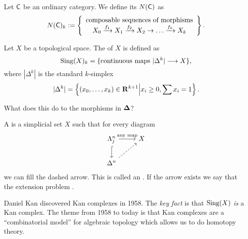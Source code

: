 \begin{example}
	Let $\mathsf{C}$ be an ordinary category. We define its  $N(\mathsf{C})$ as
	\[
		N(\C)_k \defeq \left\{ \begin{array}{c}
			\text{composable sequences of morphisms} \\
			X_0 \xrightarrow{f_1} X_1\xrightarrow{f_2}X_2\to \dots\xrightarrow{f_k} X_k
		\end{array}\right\} . 
	\] 
\end{example}
\begin{example}
	Let $X$ be a topological space. The  of $X$ is defined as
	\[
	\Sing(X)_k = \{\text{continuous maps }|\Delta^{k}|\to X\} ,
	\] 
	where $|\Delta^{k}|$ is the standard $k$-simplex
	\[
		|\Delta^{k}| = \left\{ (x_0,\dots,x_k)\in \mathbf{R}^{k+1} \middle| x_i\ge 0, \sum x_i=1 \right\} .
	\] 
\end{example}
\begin{exercise}
	What does this do to the morphisms in $\mathbf{\Delta}$?
\end{exercise}
\begin{definition}
	A  is a simplicial set $X$ such that for every diagram
	\[
	\begin{tikzcd}
		\Lambda^{n}_j \ar[r,"\text{any map}"] \ar[d,hook] & X \\
		\Delta^{n} \ar[ur,dashed]
	\end{tikzcd}
	\] 
	we can fill the dashed arrow. This is called an . If the arrow exists we say that the extension problem .
\end{definition}
Daniel Kan discovered Kan complexes in 1958. The \emph{key fact} is that $\operatorname{Sing}(X)$ \emph{is} a Kan complex. The theme from 1958 to today is that Kan complexes are a ``combinatorial model'' for algebraic topology which allows us to do homotopy theory.


